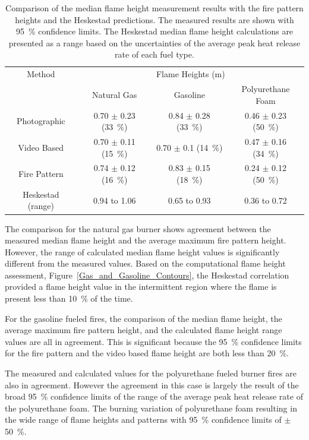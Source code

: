 \documentclass[twoside]{uocthesis}
\begin{document}
{\begin{table}
\centering
\footnotesize
\begin{tabular}{|c|c|c|c|}
\hline
Method          &   \multicolumn{3}{|c|}{Flame Heights (m)} \\ \cline{2-4}
                &       Natural Gas	            &   Gasoline	            & Polyurethane Foam \\ \hline 
Photographic    &       0.70 $\pm$ 0.23 (33~\%)   &	0.84 $\pm$ 0.28 (33~\%) 	& 0.46 $\pm$ 0.23 (50~\%)   \\
Video Based     &   	0.70 $\pm$ 0.11 (15~\%)   &	0.70 $\pm$ 0.1 (14~\%) 	& 0.47 $\pm$ 0.16 (34~\%)   \\
Fire Pattern    &   	0.74 $\pm$ 0.12 (16~\%)   &	0.83 $\pm$ 0.15 (18~\%) 	& 0.24 $\pm$ 0.12 (50~\%)   \\
Heskestad (range)  &   	0.94 to 1.06		    &	0.65 to 0.93        	& 0.36 to 0.72   \\
\hline
\end{tabular}
 \caption[Comparison of the median flame height measurement results with the fire pattern heights and the Heskestad predictions]{Comparison of the median flame height measurement results with the fire pattern heights and the Heskestad predictions. The measured results are shown with 95~\% confidence limits.  The Heskestad median flame height calculations are presented as a range based on the uncertainties of the average peak heat release rate of each fuel type.} 
 \label{tab:Comparing_Flame_Heights}
\end{table}

 The comparison for the natural gas burner shows agreement between the measured median flame height and the average maximum fire pattern height. However, the range of calculated median flame height values is significantly different from the measured values. Based on the computational flame height assessment, Figure~\ref{Gas_and_Gasoline_Contours}, the Heskestad correlation provided a flame height value in the intermittent region where the flame is present less than 10~\% of the time.     

For the gasoline fueled fires, the comparison of the median flame height, the average maximum fire pattern height, and the calculated flame height range values are all in agreement. This is significant because the 95~\% confidence limits for the fire pattern and the video based flame height are both less than 20~\%.

The measured and calculated values for the polyurethane fueled burner fires are also in agreement.  However the agreement in this case is largely the result of the broad 95~\% confidence limits of the range of the average peak heat release rate of the polyurethane foam.  The burning variation of polyurethane foam resulting in the wide range of flame heights and patterns with 95~\% confidence limits of $\pm$ 50~\%. 

}
\end{document}
